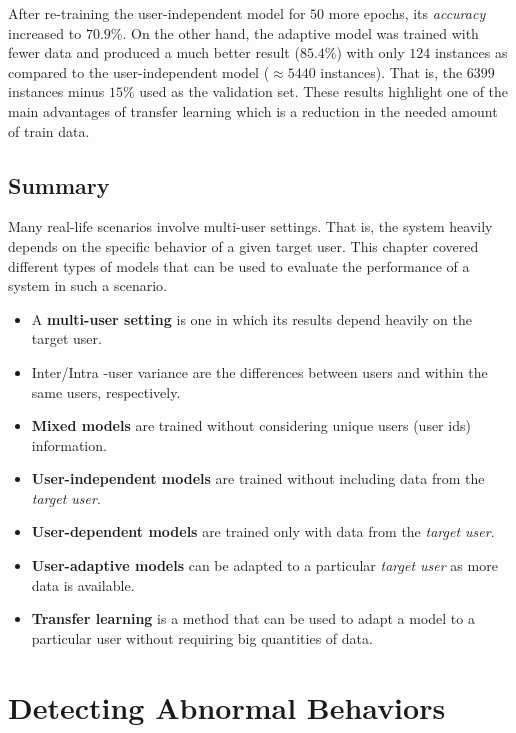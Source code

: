 \documentclass[
  11pt,
]{krantz}
\providecommand{\tightlist}{%
  \setlength{\itemsep}{0pt}\setlength{\parskip}{0pt}}
\begin{document}
After re-training the user-independent model for \(50\) more epochs, its \emph{accuracy} increased to \(70.9\%\). On the other hand, the adaptive model was trained with fewer data and produced a much better result (\(85.4\%\)) with only \(124\) instances as compared to the user-independent model (\(\approx 5440\) instances). That is, the \(6399\) instances minus \(15\%\) used as the validation set. These results highlight one of the main advantages of transfer learning which is a reduction in the needed amount of train data.

\hypertarget{SummaryMultiUser}{%
\section{Summary}\label{SummaryMultiUser}}

Many real-life scenarios involve multi-user settings. That is, the system heavily depends on the specific behavior of a given target user. This chapter covered different types of models that can be used to evaluate the performance of a system in such a scenario.

\begin{itemize}
\tightlist
\item
  A \textbf{multi-user setting} is one in which its results depend heavily on the target user.
\item
  Inter/Intra -user variance are the differences between users and within the same users, respectively.
\item
  \textbf{Mixed models} are trained without considering unique users (user ids) information.
\item
  \textbf{User-independent models} are trained without including data from the \emph{target user}.
\item
  \textbf{User-dependent models} are trained only with data from the \emph{target user}.
\item
  \textbf{User-adaptive models} can be adapted to a particular \emph{target user} as more data is available.
\item
  \textbf{Transfer learning} is a method that can be used to adapt a model to a particular user without requiring big quantities of data.
\end{itemize}



\hypertarget{abnormalbehaviors}{%
\chapter{Detecting Abnormal Behaviors}\label{abnormalbehaviors}}
\end{document}

